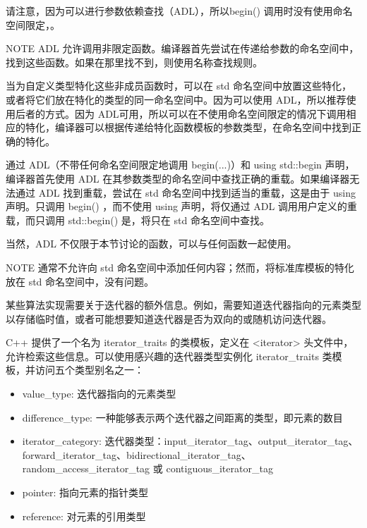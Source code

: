 请注意，因为可以进行参数依赖查找（ADL），所以begin() 调用时没有使用命名空间限定，。

\begin{myNotic}{NOTE}
ADL 允许调用非限定函数。编译器首先尝试在传递给参数的命名空间中，找到这些函数。如果在那里找不到，则使用名称查找规则。
\end{myNotic}

当为自定义类型特化这些非成员函数时，可以在 std 命名空间中放置这些特化，或者将它们放在特化的类型的同一命名空间中。因为可以使用 ADL，所以推荐使用后者的方式。因为 ADL可用，所以可以在不使用命名空间限定的情况下调用相应的特化，编译器可以根据传递给特化函数模板的参数类型，在命名空间中找到正确的特化。

通过 ADL（不带任何命名空间限定地调用 begin(...)）和 using std::begin 声明，编译器首先使用 ADL 在其参数类型的命名空间中查找正确的重载。如果编译器无法通过 ADL 找到重载，尝试在 std 命名空间中找到适当的重载，这是由于 using 声明。只调用 begin() ，而不使用 using 声明，将仅通过 ADL 调用用户定义的重载，而只调用 std::begin() 是，将只在 std 命名空间中查找。

当然，ADL 不仅限于本节讨论的函数，可以与任何函数一起使用。

\begin{myNotic}{NOTE}
通常不允许向 std 命名空间中添加任何内容；然而，将标准库模板的特化放在 std 命名空间中，没有问题。
\end{myNotic}


某些算法实现需要关于迭代器的额外信息。例如，需要知道迭代器指向的元素类型以存储临时值，或者可能想要知道迭代器是否为双向的或随机访问迭代器。

C++ 提供了一个名为 iterator\_traits 的类模板，定义在 <iterator> 头文件中，允许检索这些信息。可以使用感兴趣的迭代器类型实例化 iterator\_traits 类模板，并访问五个类型别名之一：

\begin{itemize}
\item
value\_type: 迭代器指向的元素类型

\item
difference\_type: 一种能够表示两个迭代器之间距离的类型，即元素的数目

\item
iterator\_category: 迭代器类型：input\_iterator\_tag、output\_iterator\_tag、forward\_iterator\_tag、bidirectional\_iterator\_tag、random\_access\_iterator\_tag 或 contiguous\_iterator\_tag

\item
pointer: 指向元素的指针类型

\item
reference: 对元素的引用类型
\end{itemize}

